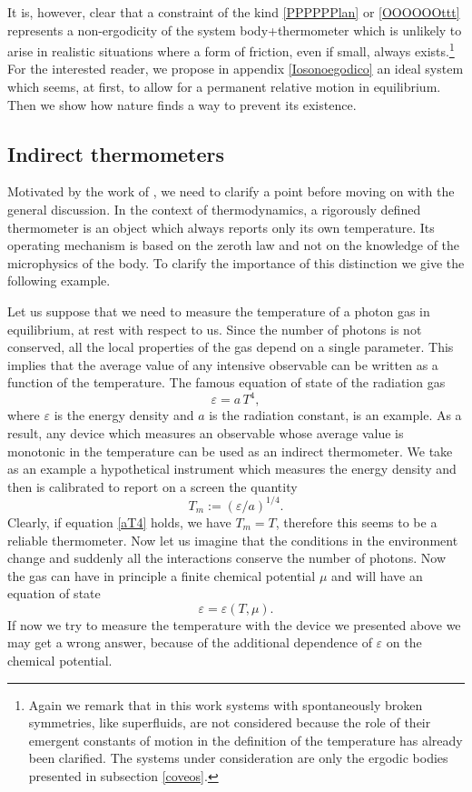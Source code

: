 \documentclass[twocolumn,usenatbib]{mnras2}
\begin{document}
It is, however, clear that a constraint of the kind \eqref{PPPPPPlan} or \eqref{OOOOOOttt} represents a non-ergodicity of the system body+thermometer which is unlikely to arise in realistic situations where a form of friction, even if small, always exists.\footnote{Again we remark that in this work systems with spontaneously broken symmetries, like superfluids, are not considered because the role of their emergent constants of motion in the definition of the temperature has already been clarified. The systems under consideration are only the ergodic bodies presented in subsection \ref{coveos}.} For the interested reader, we propose in appendix \ref{Iosonoegodico} an ideal system which seems, at first, to allow for a permanent relative motion in equilibrium. Then we show how nature finds a way to prevent its existence. 



\subsection{Indirect thermometers}

Motivated by the work of \cite{Landsberg_1996}, we need to clarify a point before moving on with the general discussion. In the context of thermodynamics, a rigorously defined thermometer is an object which always reports only its own temperature. Its operating mechanism is based on the zeroth law and not on the knowledge of the microphysics of the body. To clarify the importance of this distinction we give the following example.

Let us suppose that we need to measure the temperature of a photon gas in equilibrium, at rest with respect to us. Since the number of photons is not conserved, all the local properties of the gas depend on a single parameter. This implies that the average value of any intensive observable can be written as a function of the temperature. The famous equation of state of the radiation gas
\begin{equation}\label{aT4}
\varepsilon = a \, T^4,
\end{equation}
where $\varepsilon$ is the energy density and $a$ is the radiation constant, is an example. As a result, any device which measures an observable whose average value is monotonic in the temperature can be used as an indirect thermometer. We take as an example a hypothetical instrument which measures the energy density and then is calibrated to report on a screen the quantity
\begin{equation}
T_{m} := (\varepsilon/a)^{1/4}.
\end{equation}
Clearly, if equation \eqref{aT4} holds, we have $T_m=T$, therefore this seems to be a reliable thermometer. Now let us imagine that the conditions in the environment change and suddenly all the interactions conserve the number of photons. Now the gas can have in principle a finite chemical potential $\mu$ and will have an equation of state
\begin{equation}
\varepsilon = \varepsilon(T,\mu).
\end{equation}  
If now we try to measure the temperature with the device we presented above we may get a wrong answer, because of the additional dependence of $\varepsilon$ on the chemical potential.
\end{document}

